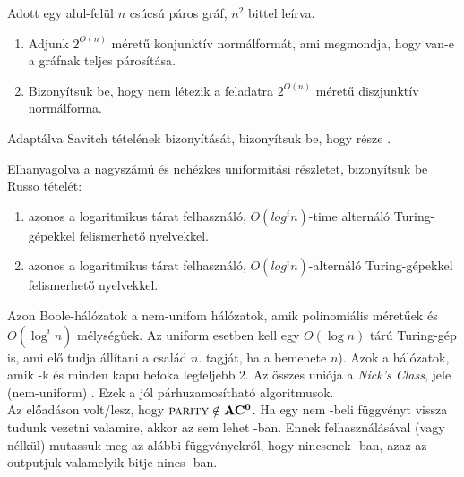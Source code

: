 \begin{Exercise}[counter={sorszam}, difficulty=0]
	Adott egy alul-felül $n$ csúcsú páros gráf, $n^2$ bittel leírva.
	\begin{enumerate}
		\item Adjunk $2^{O(n)}$ méretű konjunktív normálformát, ami megmondja, hogy van-e a gráfnak teljes párosítása.
		\item Bizonyítsuk be, hogy nem létezik a feladatra $2^{O(n)}$ méretű diszjunktív normálforma.
	\end{enumerate}
\end{Exercise}


\begin{Exercise}[counter={sorszam}, difficulty=0]
	Adaptálva Savitch tételének bizonyítását, bizonyítsuk be, hogy \NL része .
\end{Exercise}


\begin{Exercise}[counter={sorszam}, difficulty=1]
	Elhanyagolva a nagyszámú és nehézkes uniformitási részletet, bizonyítsuk be Russo tételét:
	\begin{enumerate}
		\item {} azonos a logaritmikus tárat felhasználó, $O(log^i n)$-time alternáló Turing-gépekkel felismerhető nyelvekkel.
		\item {} azonos a logaritmikus tárat felhasználó, $O(log^i n)$-alternáló Turing-gépekkel felismerhető nyelvekkel.
	\end{enumerate}
\end{Exercise}

 Azon Boole-hálózatok a nem-unifom  hálózatok, amik polinomiális méret\H uek \'es $O(\log^i n)$ mélység\H uek.
Az uniform esetben kell egy $O(\log n)$ t\'ar\'u Turing-g\'ep is, ami el\H o tudja \'all\'itani a csal\'ad $n$. tagj\'at, ha a bemenete $n$).
Azok a  hálózatok, amik -k és minden kapu befoka legfeljebb 2.
Az \"osszes uni\'oja a {\it Nick's Class}, jele (nem-uniform) .
Ezek a j\'ol p\'arhuzamos\'ithat\'o algoritmusok.\\
Az el\H oad\'ason volt/lesz, hogy $\la{Parity}\notin\ACnull$.
Ha egy nem \ACnull-beli függvényt vissza tudunk vezetni valamire, akkor az sem lehet \ACnull-ban. Ennek felhasználásával (vagy n\'elk\"ul) mutassuk meg az alábbi függvényekr\H ol, hogy nincsenek \ACnull-ban, azaz az outputjuk valamelyik bitje nincs \ACnull-ban.

